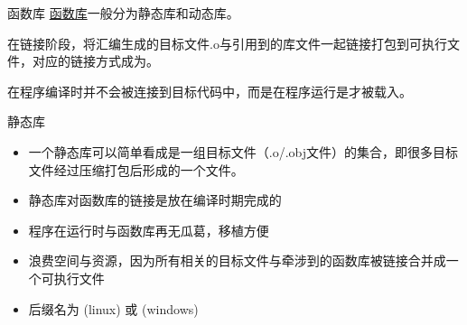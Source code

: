 


\begin{frame}{函数库}
  \href{http://www.cnblogs.com/skynet/p/3372855.html}{函数库}一般分为静态库和动态库。
  \begin{defn}[静态库]{}
    在链接阶段，将汇编生成的目标文件.o与引用到的库文件一起链接打包到可执行文件，对应的链接方式成为。
  \end{defn}

  \begin{defn}[动态库]{}
    在程序编译时并不会被连接到目标代码中，而是在程序运行是才被载入。
  \end{defn}
\end{frame}

\begin{frame}{静态库}
  \begin{free}[静态库的特点]{}
    \begin{itemize}
    \item 一个静态库可以简单看成是一组目标文件（.o/.obj文件）的集合，即很多目标文件经过压缩打包后形成的一个文件。\\[.1in]
    \item 静态库对函数库的链接是放在编译时期完成的 \\[.1in]
    \item 程序在运行时与函数库再无瓜葛，移植方便 \\[.1in]
    \item 浪费空间与资源，因为所有相关的目标文件与牵涉到的函数库被链接合并成一个可执行文件\\[.1in]
    \item 后缀名为  (linux) 或  (windows)
    \end{itemize}
  \end{free}

\end{frame}

